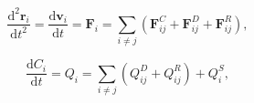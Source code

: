 \documentclass[12pt]{article}
\begin{document}
$$
  \frac{\mathrm{d}^2 \mathbf{r}_i}{\mathrm{d} t^2} = \frac{\mathrm{d} \mathbf{v}_i}{\mathrm{d} t}=\mathbf{F}_{i}=\sum_{i\neq j}(\mathbf{F}_{ij}^{C}+\mathbf{F}_{ij}^{D}+\mathbf{F}_{ij}^{R}),
$$

$$
  \frac{\mathrm{d} C_{i}}{\mathrm{d} t}= Q_{i} = \sum_{i\neq j}(Q_{ij}^{D}+Q_{ij}^{R}) + Q_{i}^{S}, 
$$
\end{document}
